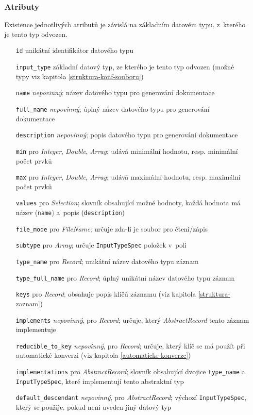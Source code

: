 \documentclass[FM,MP]{tulthesis}
\begin{document}
			\subsubsection{Atributy}
				Existence jednotlivých atributů je závislá na základním datovém typu, z~kterého je tento typ odvozen.
				\begin{itemize}[leftmargin=4cm]
					\setlength\itemsep{-2mm}
					\item[\texttt{id}] unikátní identifikátor datového typu
					\item[\texttt{input\_type}] základní datový typ, ze kterého je tento typ odvozen (možné typy viz kapitola \ref{struktura-konf-souboru})
					\item[\texttt{name}] \textit{nepovinný}; název datového typu pro generování dokumentace
					\item[\texttt{full\_name}] \textit{nepovinný}; úplný název datového typu pro generování dokumentace
					\item[\texttt{description}] \textit{nepovinný}; popis datového typu pro generování dokumentace
					\item[\texttt{min}] pro \textit{Integer}, \textit{Double}, \textit{Array}; udává minimální hodnotu, resp. minimální počet prvků
					\item[\texttt{max}] pro \textit{Integer}, \textit{Double}, \textit{Array}; udává maximální hodnotu, resp. maximální počet prvků
					\item[\texttt{values}] pro \textit{Selection}; slovník obsahující možné hodnoty, každá hodnota má název (\texttt{name}) a~popis (\texttt{description})
					\item[\texttt{file\_mode}] pro \textit{FileName}; určuje zda-li je soubor pro čtení/zápis
					\item[\texttt{subtype}] pro \textit{Array}; určuje \texttt{InputTypeSpec} položek v~poli
					\item[\texttt{type\_name}] pro \textit{Record}; unikátní název datového typu záznam
					\item[\texttt{type\_full\_name}] pro \textit{Record}; úplný unikátní název datového typu záznam
					\item[\texttt{keys}] pro \textit{Record}; obsahuje popis klíčů záznamu (viz kapitola \ref{struktura-zaznam})
					\item[\texttt{implements}] \textit{nepovinný}, pro \textit{Record}; určuje, který \textit{AbstractRecord} tento záznam implementuje
					\item[\texttt{reducible\_to\_key}] \textit{nepovinný}, pro \textit{Record}; určuje, který klíč se má použít při automatické konverzi (viz kapitola \ref{automaticke-konverze})
					\item[\texttt{implementations}] pro \textit{AbstractRecord}; slovník obsahující dvojice \texttt{type\_name} a \texttt{InputTypeSpec}, které implementují tento abstraktní typ
					\item[\texttt{default\_descendant}] \textit{nepovinný}, pro \textit{AbstractRecord}; výchozí \texttt{InputTypeSpec}, který se použije, pokud není uveden jiný datový typ
				\end{itemize}
\end{document}
